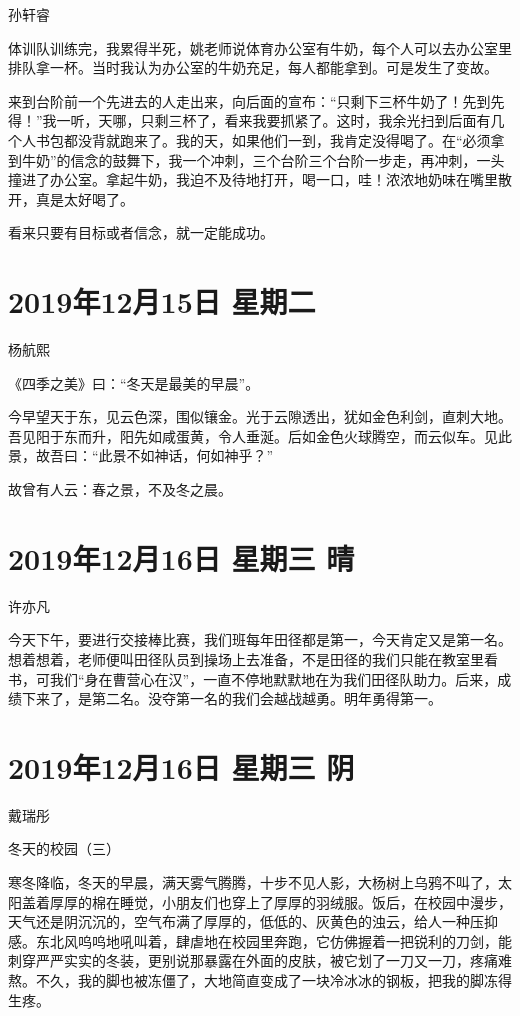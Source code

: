 孙轩睿

体训队训练完，我累得半死，姚老师说体育办公室有牛奶，每个人可以去办公室里排队拿一杯。当时我认为办公室的牛奶充足，每人都能拿到。可是发生了变故。

来到台阶前一个先进去的人走出来，向后面的宣布：``只剩下三杯牛奶了！先到先得！''我一听，天哪，只剩三杯了，看来我要抓紧了。这时，我余光扫到后面有几个人书包都没背就跑来了。我的天，如果他们一到，我肯定没得喝了。在``必须拿到牛奶''的信念的鼓舞下，我一个冲刺，三个台阶三个台阶一步走，再冲刺，一头撞进了办公室。拿起牛奶，我迫不及待地打开，喝一口，哇！浓浓地奶味在嘴里散开，真是太好喝了。

看来只要有目标或者信念，就一定能成功。

\section{2019年12月15日 星期二}

杨航熙

《四季之美》曰：``冬天是最美的早晨''。

今早望天于东，见云色深，围似镶金。光于云隙透出，犹如金色利剑，直刺大地。吾见阳于东而升，阳先如咸蛋黄，令人垂涎。后如金色火球腾空，而云似车。见此景，故吾曰：``此景不如神话，何如神乎？''

故曾有人云：春之景，不及冬之晨。

\section{2019年12月16日 星期三 晴}

许亦凡

今天下午，要进行交接棒比赛，我们班每年田径都是第一，今天肯定又是第一名。想着想着，老师便叫田径队员到操场上去准备，不是田径的我们只能在教室里看书，可我们``身在曹营心在汉''，一直不停地默默地在为我们田径队助力。后来，成绩下来了，是第二名。没夺第一名的我们会越战越勇。明年勇得第一。

\section{2019年12月16日 星期三 阴}

戴瑞彤

冬天的校园（三）

寒冬降临，冬天的早晨，满天雾气腾腾，十步不见人影，大杨树上乌鸦不叫了，太阳盖着厚厚的棉在睡觉，小朋友们也穿上了厚厚的羽绒服。饭后，在校园中漫步，天气还是阴沉沉的，空气布满了厚厚的，低低的、灰黄色的浊云，给人一种压抑感。东北风呜呜地吼叫着，肆虐地在校园里奔跑，它仿佛握着一把锐利的刀剑，能刺穿严严实实的冬装，更别说那暴露在外面的皮肤，被它划了一刀又一刀，疼痛难熬。不久，我的脚也被冻僵了，大地简直变成了一块冷冰冰的钢板，把我的脚冻得生疼。

